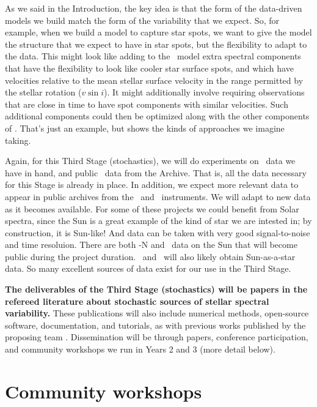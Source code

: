 \documentclass[12pt, letterpaper]{article}
\begin{document}
As we said in the Introduction, the key idea is that the form of the
data-driven models we build match the form of the variability that
we expect.
So, for example, when we build a model to capture star spots, we want
to give the model the structure that we expect to have in star spots,
but the flexibility to adapt to the data.
This might look like adding to the \wobble\ model extra spectral
components that have the flexibility to look like cooler star surface
spots, and which have velocities relative to the mean stellar surface
velocity in the range permitted by the stellar rotation ($v\sin i$).
It might additionally involve requiring observations that are close
in time to have spot components with similar velocities.
Such additional components could then be optimized along with the other
components of \wobble.
That's just an example, but shows the kinds of approaches we imagine taking.

Again, for this Third Stage (stochastics), we will do experiments on
\EXPRES\ data we have in hand, and
public \HARPS\ data from the Archive.
That is, all the data necessary for this Stage is already in place.
In addition, we expect more relevant data to appear in public archives
from the \ESPRESSO\ and \NEID\ instruments.
We will adapt to new data as it becomes available.
For some of these projects we could benefit from Solar
spectra, since the Sun is a great example of the kind of star we are
intested in; by construction, it is Sun-like!
And data can be taken with very good signal-to-noise and time resoluion.
There are both \HARPS-N and \HARPS\ data on the Sun that will become
public during the project duration. 
\EXPRES\ and \NEID\ will also likely obtain Sun-as-a-star data. 
So many excellent sources of data exist for our use in the Third Stage.

\textbf{The deliverables of the Third Stage (stochastics) will be papers in the
refereed literature about stochastic sources of stellar spectral
variability.}
These publications will also include numerical methods, open-source software, 
documentation, and tutorials, as with previous works published by the 
proposing team \citep[e.g.][]{Bedell2019}.
Dissemination will be through papers, conference participation, and
community workshops we run in Years 2 and 3 (more detail below).

\section{Community workshops}
\end{document}
